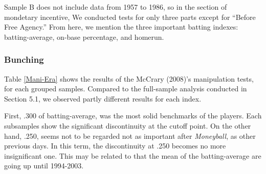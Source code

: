 \documentclass[dvipdfmx, 12pt]{article}
\begin{document}
Sample B does not include data from 1957 to 1986, so in the section of mondetary incentive, We conducted tests for only three parts except for ``Before Free Agency.'' From here, we mention the three important batting indexes: batting-average, on-base percentage, and homerun.

\subsubsection{Bunching}

Table \ref{Mani-Era} shows the results of the McCrary (2008)'s manipulation tests, for each grouped samples. Compared to the full-sample analysis conducted in Section 5.1, we observed partly different results for each index.

First, .300 of batting-average, was the most solid benchmarks of the players. Each subsamples show the significant discontinuity at the cutoff point. On the other hand, .250, seems not to be regarded not as important  after \textit{Moneyball}, as other previous days. In this term, the discontinuity at .250 becomes no more insignificant one. This may be related to that the mean of the batting-average are going up until 1994-2003. 
\end{document}
